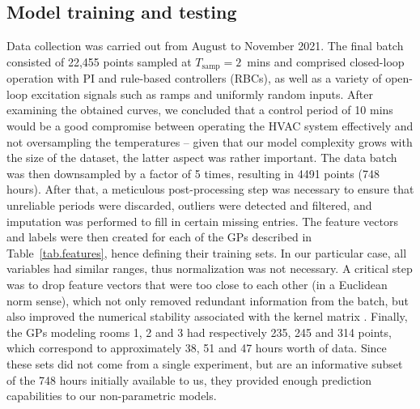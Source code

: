 \subsection{Model training and testing}
\label{sec.ModelTrainingAndTesting}

Data collection was carried out from August to November 2021. The final batch consisted of 22,455 points sampled at $T_\text{samp} = 2\,$ mins and comprised closed-loop operation with PI and rule-based controllers (RBCs), as well as a variety of open-loop excitation signals such as ramps and uniformly random inputs. After examining the obtained curves, we concluded that a control period of 10 mins would be a good compromise between operating the HVAC system effectively and not oversampling the temperatures -- given that our model complexity grows with the size of the dataset, the latter aspect was rather important. The data batch was then downsampled by a factor of 5 times, resulting in 4491 points (748 hours). After that, a meticulous post-processing step was necessary to ensure that unreliable periods were discarded, outliers were detected and filtered, and imputation was performed to fill in certain missing entries. The feature vectors and labels were then created for each of the GPs described in Table~\ref{tab.features}, hence defining their training sets. In our particular case, all variables had similar ranges, thus normalization was not necessary. A critical step was to drop feature vectors that were too close to each other (in a Euclidean norm sense), which not only removed redundant information from the batch, but also improved the numerical stability associated with the kernel matrix \cite{williams2006gaussian}. Finally, the GPs modeling rooms 1, 2 and 3 had respectively 235, 245 and 314 points, which correspond to approximately 38, 51 and 47 hours worth of data. Since these sets did not come from a single experiment, but are an informative subset of the 748 hours initially available to us, they provided enough prediction capabilities to our non-parametric models.

